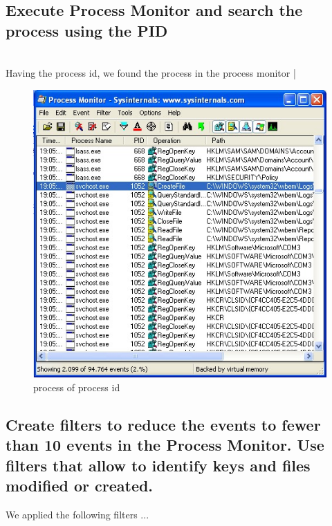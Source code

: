 \documentclass[12pt,letter]{article} %
\begin{document}
        \newpage
        \subsection{Execute Process Monitor and search the process using the PID}
            $ $\\
            Having the process id, we found the process in the process monitor |
            \begin{figure}[h!]
                \centering
                \includegraphics[width=0.4\linewidth]{processmal.jpeg}
                \caption{process of process id}
                \label{process id}
            \end{figure}

        \subsection{Create filters to reduce the events to fewer than 10 events
        in the Process Monitor. Use filters that allow to identify keys and
        files modified or created.}
        We applied the following filters ...
\end{document}
